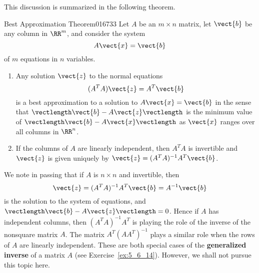 This discussion is summarized in the following theorem.

\begin{theorem}{Best Approximation Theorem}{016733} %
Let $A$ be an $m \times n$ matrix, let $\vect{b}$ be any column in $\RR^m$, and consider the system
\begin{equation*}
A\vect{x} = \vect{b}
\end{equation*}
of $m$ equations in $n$ variables.

\begin{enumerate}
\item Any solution $\vect{z}$ to the normal equations
\begin{equation*}
(A^TA)\vect{z} = A^T\vect{b}
\end{equation*}
is a best approximation to a solution to $A\vect{x} = \vect{b}$ in the sense that $\vectlength\vect{b} - A\vect{z}\vectlength$ is the minimum value of $\vectlength\vect{b} - A\vect{x}\vectlength$ as $\vect{x}$ ranges over all columns in $\RR^n$.

\item If the columns of $A$ are linearly independent, then $A^{T}A$ is invertible and $\vect{z}$ is given uniquely by $\vect{z} = (A^{T}A)^{-1}A^{T}\vect{b}$.

\end{enumerate}
\end{theorem}

\noindent We note in passing that if $A$ is $n \times n$ and invertible, then
\begin{equation*}
\vect{z} = (A^TA)^{-1} A^T\vect{b} = A^{-1}\vect{b}
\end{equation*}
is the solution to the system of equations, and $\vectlength\vect{b} - A\vect{z}\vectlength = 0$. Hence if $A$ has independent columns, then $(A^{T}A)^{-1}A^{T}$ is playing the role of the inverse of the nonsquare matrix $A$. The matrix $A^{T}(AA^{T})^{-1}$ plays a similar role when the rows of $A$ are linearly independent. These are both special cases of the \textbf{generalized inverse} of a matrix $A$ (see Exercise~\ref{ex:5_6_14}). However, we shall not pursue this topic here.


